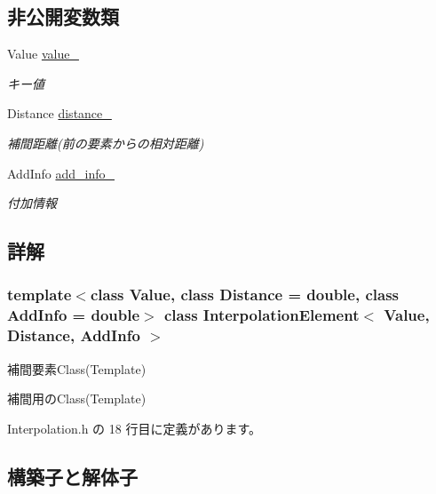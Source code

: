 \subsection*{非公開変数類}
\begin{DoxyCompactItemize}
\item 
Value \mbox{\hyperlink{class_interpolation_element_ab032d3e1d0cfaa9d2fe6560a1633b7e0}{value\+\_\+}}
\begin{DoxyCompactList}\small\item\em キー値 \end{DoxyCompactList}\item 
Distance \mbox{\hyperlink{class_interpolation_element_a8c7cba752cfa48df627b64f7924a7edf}{distance\+\_\+}}
\begin{DoxyCompactList}\small\item\em 補間距離(前の要素からの相対距離) \end{DoxyCompactList}\item 
Add\+Info \mbox{\hyperlink{class_interpolation_element_ad167e0db48484051ee336f45e010b536}{add\+\_\+info\+\_\+}}
\begin{DoxyCompactList}\small\item\em 付加情報 \end{DoxyCompactList}\end{DoxyCompactItemize}


\subsection{詳解}
\subsubsection*{template$<$class Value, class Distance = double, class Add\+Info = double$>$\newline
class Interpolation\+Element$<$ Value, Distance, Add\+Info $>$}

補間要素\+Class(\+Template) 

補間用の\+Class(\+Template) 

 Interpolation.\+h の 18 行目に定義があります。



\subsection{構築子と解体子}
\mbox{\label{class_interpolation_element_a727cf8064628102adb1b0b61caeaa347}} 
